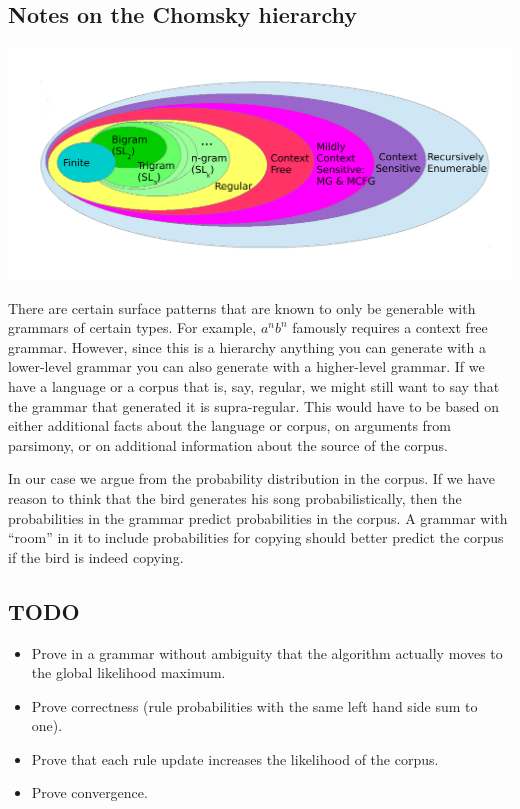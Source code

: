 \documentclass[12pt]{article}
\theoremstyle{definition}
\begin{document}
\subsection{Notes on the Chomsky hierarchy}
\label{sec:notes-chomsky-hier}

\includegraphics[width=6in]{Chomsky-hierarchy.pdf}

There are certain surface patterns that are known to only be generable with grammars of certain types. For example, $a^nb^n$ famously requires a context free grammar. However, since this is a hierarchy anything you can generate with a lower-level grammar you can also generate with a higher-level grammar. If we have a language or a corpus that is, say, regular, we might still want to say that the grammar that generated it is supra-regular. This would have to be based on either additional facts about the language or corpus, on arguments from parsimony, or on additional information about the source of the corpus. 

In our case we argue from the probability distribution in the corpus. If we have reason to think that the bird generates his song probabilistically, then the probabilities in the grammar predict probabilities in the corpus. A grammar with ``room'' in it to include probabilities for copying should better predict the corpus if the bird is indeed copying.




\subsection{TODO}
\begin{itemize}
\item Prove in a grammar without ambiguity that the algorithm actually moves to the global likelihood maximum.
\item Prove correctness (rule probabilities with the same left hand side sum to one).
\item Prove that each rule update increases the likelihood of the corpus.
\item Prove convergence.
\end{itemize}
\end{document}
